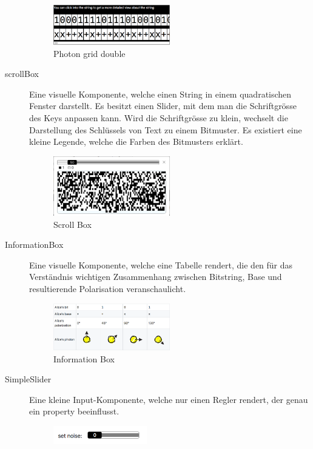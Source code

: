 \documentclass[a4paper,10.2pt,pdftex]{scrartcl}%
\begin{document}
\begin{description}
\begin{figure}[h]
	\centering
  \includegraphics[width=0.5\textwidth]{graphics/component_photon_grid_double.png}
	\caption{Photon grid double}
\end{figure} 
\item[scrollBox] Eine visuelle Komponente, welche einen String in einem quadratischen Fenster darstellt. Es besitzt einen Slider, mit dem man die Schriftgrösse des Keys anpassen kann. Wird die Schriftgrösse zu klein, wechselt die Darstellung des Schlüssels von Text zu einem Bitmuster. Es existiert eine kleine Legende, welche die Farben des Bitmusters erklärt.
\begin{figure}[h]
	\centering
  \includegraphics[width=0.5\textwidth]{graphics/component_scroll_box.png}
	\caption{Scroll Box}
\end{figure}
\item[InformationBox] Eine visuelle Komponente, welche eine Tabelle rendert, die den für das Verständnis wichtigen Zusammenhang zwischen Bitstring, Base und resultierende Polarisation veranschaulicht.
\begin{figure}[h]
	\centering
  \includegraphics[width=0.5\textwidth]{graphics/component_information_box.png}
	\caption{Information Box}
\end{figure}
\item[SimpleSlider] Eine kleine Input-Komponente, welche nur einen Regler rendert, der genau ein property beeinflusst. 
\begin{figure}[h]
	\centering
  \includegraphics[width=0.4\textwidth]{graphics/component_simple_slider.png}

\end{figure}
\end{description}
\end{document}
